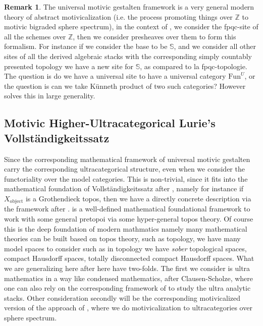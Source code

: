 \documentclass[12pt]{article}
\theoremstyle{definition}
\newtheorem{remark}{Remark}
\begin{document}
\begin{remark}
The universal motivic gestalten framework is a very general modern theory of abstract motivicalization (i.e. the process promoting things over $\mathbb{Z}$ to motivic bigraded sphere spectrum), in the context of \cite{5S4}, we consider the fpqc-site of all the schemes over $\mathbb{Z}$, then we consider presheaves over them to form this formalism. For instance if we consider the base to be $\mathbb{S}$, and we consider all other sites of all the derived algebraic stacks with the corresponding simply countably presented topology we have a new site for $\mathbb{S}$, as compared to la fpqc-topologie. The question is do we have a universal site to have a universal category $\mathrm{Fun}^U$, or the question is can we take K\"unneth product of two such categories? However \cite{5S5} solves this in large generality. 
\end{remark}

\subsection{Motivic Higher-Ultracategorical Lurie's Vollst\"andigkeitssatz}

Since the corresponding mathematical framework of universal motivic gestalten carry the corresponding ultracategorical structure, even when we consider the functoriality over the model categories. This is non-trivial, since it fits into the mathematical foundation of Vollst\"andigkeitssatz after \cite{5Lu3}, namely for instance if $X_\mathrm{object}$ is a Grothendieck topos, then we have a directly concrete description via the framework after \cite{5Lu3}. \cite{5Lu3} is a well-defined mathematical foundational framework to work with some general pretopoi via some hyper-general topos theory. Of course this is the deep foundation of modern mathmatics namely many mathematical theories can be built based on topos theory, such as topology, we have many model spaces to consider such as in topology we have \textit{sober} topological spaces, compact Hausdorff spaces, totally disconnected compact Hausdorff spaces. What we are generalizing here after \cite{5Lu3} here have two-folds. The first we consider is ultra mathematics in a way like condensed mathematics, after Clausen-Scholze, where one can also rely on the corresponding framework of \cite{5S5} to study the ultra analytic stacks. Other consideration secondly will be the corresponding motivicalized version of the approach of \cite{5Lu3}, where we do motivicalization to ultracategories over sphere spectrum. 
\end{document}
